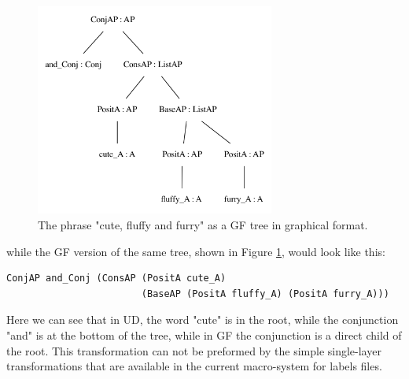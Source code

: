 \documentclass{article}
\begin{document}
\begin{figure}
    \centering
    \includegraphics[width=0.7\textwidth]{cute_gf.png}
    \caption{The phrase "cute, fluffy and furry" as a GF tree in graphical format. }
    \label{fig:gf_cute}
\end{figure}

while the GF version of the same tree, shown in Figure \ref{fig:gf_cute}, would look like this:

\begin{verbatim}
ConjAP and_Conj (ConsAP (PositA cute_A)
                        (BaseAP (PositA fluffy_A) (PositA furry_A)))
\end{verbatim}
Here we can see that in UD, the word "cute" is in the root, while the conjunction "and" is at the bottom of the tree, while in GF the conjunction is a direct child of the root. This transformation can not be preformed by the simple single-layer transformations that are available in the current macro-system for labels files.

%
%
%


\end{document}

